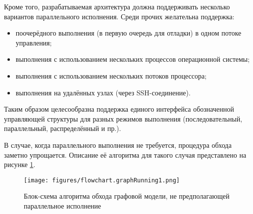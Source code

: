 Кроме того, разрабатываемая архитектура должна поддерживать несколько вариантов параллельного исполнения. Среди прочих желательна поддержка:
\begin{itemize}
    \item поочерёдного выполнения (в первую очередь для отладки) в одном потоке управления;
    \item выполнения с использованием нескольких процессов операционной системы;
    \item выполнения с использованием нескольких потоков процессора;
    \item выполнения на удалённых узлах (через SSH-соединение).
\end{itemize}

Таким образом целесообразна поддержка единого интерфейса обозначенной управляющей структуры для разных режимов выполнения (последовательный, параллельный, распределённый и пр.).

В случае, когда параллельного выполнения не требуется, процедура обхода заметно упрощается. Описание её алгоритма для такого случая представлено на рисунке \ref{fig:flowchartNoBranching}.

\begin{figure}[!ht]
    \centering
    \texttt{[image: figures/flowchart.graphRunning1.png]}
    \caption{Блок-схема алгоритма обхода графовой модели, не предполагающей параллельное исполнение}
    \label{fig:flowchartNoBranching}
\end{figure}



